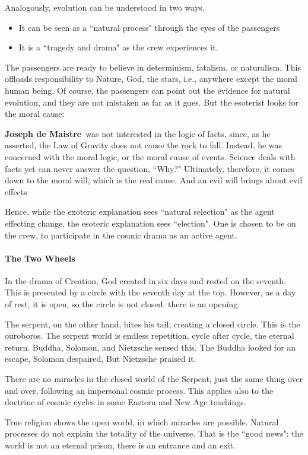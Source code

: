 Analogously, evolution can be understood in two ways.

\begin{itemize}
\item It can be seen as a ``natural process" through the eyes of the passengers 
\item It is a ``tragedy and drama" as the crew experiences it. 
\end{itemize}
The passengers are ready to believe in determinism, fatalism, or naturalism. This offloads responsibility to Nature, God, the stars, i.e., anywhere except the moral human being. Of course, the passengers can point out the evidence for natural evolution, and they are not mistaken as far as it goes. But the esoterist looks for the moral cause:

\textbf{Joseph de Maistre} was not interested in the logic of facts, since, as he asserted, the Law of Gravity does not cause the rock to fall. Instead, he was concerned with the moral logic, or the moral cause of events. Science deals with facts yet can never answer the question, ``Why?" Ultimately, therefore, it comes down to the moral will, which is the real cause. And an evil will brings about evil effects

Hence, while the exoteric explanation sees ``natural selection" as the agent effecting change, the esoteric explanation sees ``election". One is chosen to be on the crew, to participate in the cosmic drama as an active agent.

\paragraph{The Two Wheels}
In the drama of Creation, God created in six days and rested on the seventh. This is presented by a circle with the seventh day at the top. However, as a day of rest, it is open, so the circle is not closed: there is an opening.

The serpent, on the other hand, bites his tail, creating a closed circle. This is the ouroboros. The serpent world is endless repetition, cycle after cycle, the eternal return. Buddha, Solomon, and Nietzsche sensed this. The Buddha looked for an escape, Solomon despaired, But Nietzsche praised it.

There are no miracles in the closed world of the Serpent, just the same thing over and over, following an impersonal cosmic process. This applies also to the doctrine of cosmic cycles in some Eastern and New Age teachings.

True religion shows the open world, in which miracles are possible. Natural processes do not explain the totality of the universe. That is the ``good news": the world is not an eternal prison, there is an entrance and an exit.

